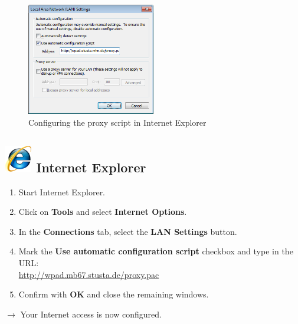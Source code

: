 \documentclass[a4paper,12pt]{scrartcl}
\newcommand{\optemph}[1]{\textbf{#1}}
\begin{document}
\begin{figure}
  \begin{center}
    \includegraphics[width=0.5\textwidth,keepaspectratio]{Bilder/Proxy_IE_EN}
  \end{center}
  \caption{Configuring the proxy script in Internet Explorer}
\end{figure}

\subsection*{\includegraphics[height=1.2cm,keepaspectratio]{Bilder/Internet_Explorer_7_Logo} Internet Explorer}
\begin{enumerate}
    \item Start Internet Explorer.
	\item Click on \optemph{Tools} and select \optemph{Internet Options}.
	\item In the \optemph{Connections} tab, select the \optemph{LAN Settings} button.
	\item Mark the \optemph{Use automatic configuration script} checkbox and type in the URL: \\ \url{http://wpad.mb67.stusta.de/proxy.pac}
	\item Confirm with \optemph{OK} and close the remaining windows.
\end{enumerate}
$\rightarrow$ Your Internet access is now configured.
\end{document}
